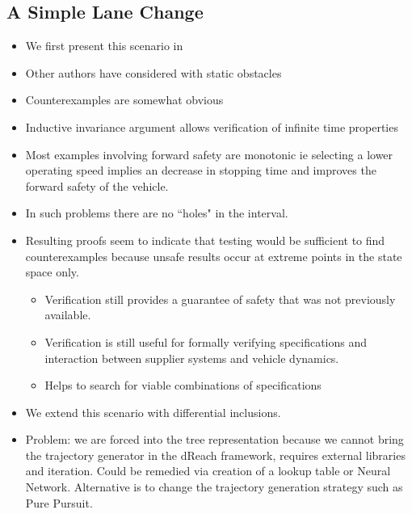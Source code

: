 \documentclass{easychair}
\theoremstyle{theorem}
\theoremstyle{remark}
\begin{document}
\subsection{A Simple Lane Change}
\begin{itemize}
	\item We first present this scenario in \cite{blah}
	\item Other authors \cite{blah} have considered with static obstacles
	\item Counterexamples are somewhat obvious
	\item Inductive invariance argument allows verification of infinite time properties
		\item Most examples involving forward safety are monotonic ie selecting a lower operating speed implies an decrease in stopping time and improves the forward safety of the vehicle. 
		\item In such problems there are no ``holes" in the interval. 
		\item Resulting proofs seem to indicate that testing would be sufficient to find counterexamples because unsafe results occur at extreme points in the state space only.
		\begin{itemize}
			\item Verification still provides a guarantee of safety that was not previously available. 
			\item Verification is still useful for formally verifying specifications and interaction between supplier systems and vehicle dynamics.
			\item Helps to search for viable combinations of specifications
		\end{itemize}
	\item We extend this scenario with differential inclusions. 
	\item Problem: we are forced into the tree representation because we cannot bring the trajectory generator in the dReach framework, requires external libraries and iteration. Could be remedied via creation of a lookup table or Neural Network. Alternative is to change the trajectory generation strategy such as Pure Pursuit.
\end{itemize}
\end{document}
